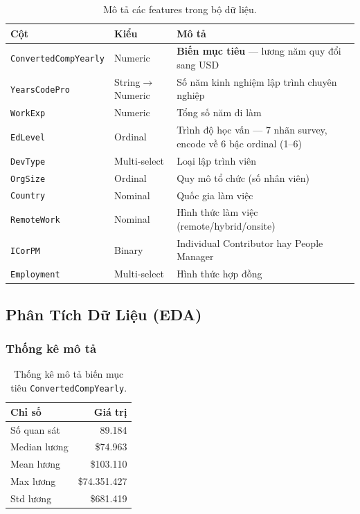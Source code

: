 \begin{table}[H]
\centering
\begin{tabular}{llp{8.5cm}}
\toprule
\textbf{Cột} & \textbf{Kiểu} & \textbf{Mô tả} \\
\midrule
\texttt{ConvertedCompYearly} & Numeric & \textbf{Biến mục tiêu} — lương năm quy đổi sang USD \\
\texttt{YearsCodePro} & String$\to$Numeric & Số năm kinh nghiệm lập trình chuyên nghiệp \\
\texttt{WorkExp} & Numeric & Tổng số năm đi làm \\
\texttt{EdLevel} & Ordinal & Trình độ học vấn — 7 nhãn survey, encode về 6 bậc ordinal (1–6) \\
\texttt{DevType} & Multi-select & Loại lập trình viên \\
\texttt{OrgSize} & Ordinal & Quy mô tổ chức (số nhân viên) \\
\texttt{Country} & Nominal & Quốc gia làm việc \\
\texttt{RemoteWork} & Nominal & Hình thức làm việc (remote/hybrid/onsite) \\
\texttt{ICorPM} & Binary & Individual Contributor hay People Manager \\
\texttt{Employment} & Multi-select & Hình thức hợp đồng \\
\bottomrule
\end{tabular}
\caption{Mô tả các features trong bộ dữ liệu.}
\end{table}

\subsection{Phân Tích Dữ Liệu (EDA)}

\subsubsection{Thống kê mô tả}

\begin{table}[H]
\centering
\begin{tabular}{lr}
\toprule
\textbf{Chỉ số} & \textbf{Giá trị} \\
\midrule
Số quan sát & 89.184 \\
Median lương & \$74.963 \\
Mean lương & \$103.110 \\
Max lương & \$74.351.427 \\
Std lương & \$681.419 \\
\bottomrule
\end{tabular}
\caption{Thống kê mô tả biến mục tiêu \texttt{ConvertedCompYearly}.}
\end{table}

